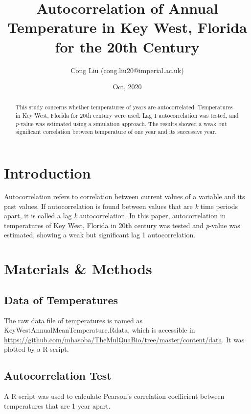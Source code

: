 \documentclass[12pt]{article}
\title{Autocorrelation of Annual Temperature in Key West, Florida for the 20th Century}
\author{Cong Liu (cong.liu20@imperial.ac.uk)}
\date{Oct, 2020}
\begin{document}
  \maketitle

  \begin{abstract}
    This study concerns whether temperatures of years are autocorrelated. Temperatures
    in Key West, Florida for 20th century were used. Lag 1 autocorrelation was tested, and 
    \textit{p}-value was estimated using a simulation approach. The results showed a weak but significant
    correlation between temperature of one year and its successive year. 
    
  \end{abstract}
  
  \section{Introduction}
  Autocorrelation refers to correlation between current values of a variable and its past values.
  If autocorrelation is found between values that are \textit{k} time periods apart, it is called
  a lag \textit{k} autocorrelation. In this paper, autocorrelation in temperatures of Key West, 
  Florida in 20th century was tested and \textit{p}-value was estimated, showing a weak but significant
  lag 1 autocorrelation.
  
  \section{Materials \& Methods}
   
    \subsection{Data of Temperatures}
    The raw data file of temperatures is named as KeyWestAnnualMeanTemperature.Rdata, 
    which is accessible in 
    \newline
    \href{https://github.com/mhasoba/TheMulQuaBio/tree/master/content/data}{https://github.com/mhasoba/TheMulQuaBio/tree/master/content/data}.
    It was plotted by a R script.
    
    \subsection{Autocorrelation Test}
    A R script was used to calculate Pearson's correlation coefficient between temperatures that
    are 1 year apart.
    
\end{document}
